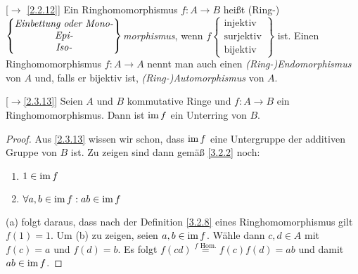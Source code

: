 \documentclass[../../main.tex]{subfiles}
\begin{document}
\begin{df}\mbox{}[$\to$ \ref{2.2.12}]\label{3.2.10}
Ein Ringhomomorphismus $f:A\to B$ heißt (Ring-) $\begin{Bmatrix}\text{\emph{Einbettung oder Mono-}}\\\text{\emph{Epi-}}\\\text{\emph{Iso-}}\end{Bmatrix}$\emph{morphismus}, wenn $f\begin{Bmatrix}\text{injektiv}\\\text{surjektiv}\\\text{bijektiv}\end{Bmatrix}$ ist. Einen Ringhomomorphismus $f:A\to A$ nennt man auch einen \emph{(Ring-)Endomorphismus} von $A$ und, falls er bijektiv ist, \emph{(Ring-)Automorphismus} von $A$.
\end{df}

\begin{pro}{\rm[$\to$\ref{2.3.13}]}\label{imfsubring}
Seien $A$ und $B$ kommutative Ringe und $f\colon A\to B$ ein Ringhomomorphismus. Dann ist $\operatorname{im} f$ ein Unterring von $B$.
\end{pro}
\begin{proof}
Aus \ref{2.3.13} wissen wir schon, dass $\operatorname{im} f$ eine Untergruppe der additiven Gruppe von $B$ ist. Zu zeigen sind dann gemäß \ref{3.2.2} noch:
\begin{enumerate}[\normalfont(a)]
\item $1\in\operatorname{im} f$
\item $\forall a,b\in\operatorname{im} f:ab\in\operatorname{im} f$
\end{enumerate}
(a) folgt daraus, dass nach der Definition \ref{3.2.8} eines Ringhomomorphismus gilt $f(1)=1$. Um (b) zu zeigen, seien $a,b\in\operatorname{im} f$. Wähle dann $c,d\in A$ mit $f(c)=a$ und $f(d)=b$.
Es folgt $f(cd)\overset{\text{$f$ Hom.}}=f(c)f(d)=ab$ und damit $ab\in\operatorname{im} f$.
\end{proof}
\end{document}

